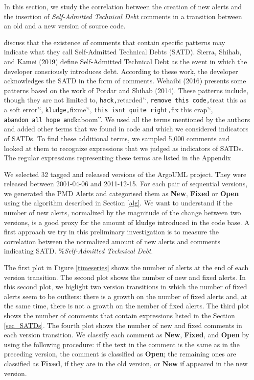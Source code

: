 \documentclass[
]{article}
\begin{document}
In this section, we study the correlation between the creation of new
alerts and the insertion of \textit{Self-Admitted Technical Debt}
comments in a transition between an old and a new version of source
code.

\cite{Potdar2014} discuss that the existence of comments that contain
specific patterns may indicate what they call Self-Admitted Technical
Debts (SATD). Sierra, Shihab, and Kamei (2019) define Self-Admitted
Technical Debt as the event in which the developer consciously
introduces debt. According to these work, the developer acknowledges the
SATD in the form of comments. Wehaibi (2016) presents some patterns
based on the work of Potdar and Shihab (2014). These patterns include,
though they are not limited to,
\texttt{hack\textquotesingle{}\textquotesingle{},}retarded'`,
\texttt{remove\ this\ code\textquotesingle{}\textquotesingle{},}treat
this as a soft error'`,
\texttt{kludge\textquotesingle{}\textquotesingle{},}fixme'`,
\texttt{this\ isn\textquotesingle{}t\ quite\ right\textquotesingle{}\textquotesingle{},}fix
this crap'`,
\texttt{abandon\ all\ hope\textquotesingle{}\textquotesingle{}\ and}kaboom''.
We used all the terms mentioned by the authors and added other terms
that we found in code and which we considered indicators of SATDs. To
find these additional terms, we sampled 5,000 comments and looked at
them to recognize expressions that we judged as indicators of SATDs. The
regular expressions representing these terms are listed in the Appendix

We selected 32 tagged and released versions of the ArgoUML project. They
were released between 2001-04-06 and 2011-12-15. For each pair of
sequential versions, we generated the PMD Alerts and categorised them as
\textbf{New}, \textbf{Fixed} or \textbf{Open} using the algorithm
described in Section \ref{alg}. We want to understand if the number of
new alerts, normalized by the magnitude of the change between two
versions, is a good proxy for the amount of kludge introduced in the
code base. A first approach we try in this preliminary investigation is
to measure the correlation between the normalized amount of new alerts
and comments indicating SATD. \%\textit{Self-Admitted Technical Debt}.

\small

\normalsize

The first plot in Figure \ref{timeseries} shows the number of alerts at
the end of each version transition. The second plot shows the number of
new and fixed alerts. In this second plot, we higlight two version
transitions in which the number of fixed alerts seem to be outliers:
there is a growth on the number of fixed alerts and, at the same time,
there is not a growth on the nember of fixed alerts. The third plot
shows the number of comments that contain expressions listed in the
Section \ref{sec_SATDs}. The fourth plot shows the number of new and
fixed comments in each version transition. We classify each comment as
\textbf{New}, \textbf{Fixed}, and \textbf{Open} by using the following
procedure: if the text in the comment is the same as in the preceding
version, the comment is classified as \textbf{Open}; the remaining ones
are classified as \textbf{Fixed}, if they are in the old version, or
\textbf{New} if appeared in the new version.
\end{document}
